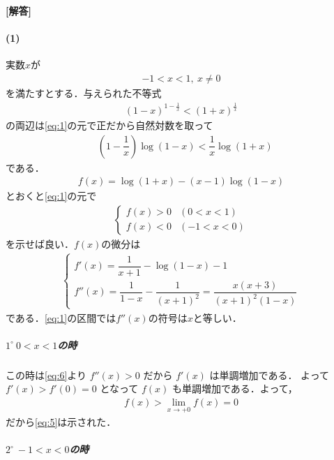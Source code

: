 \documentclass[../../main.tex]{subfiles}
\begin{document}
\begin{oframed}
  
\end{oframed}

{\bf [解答]}

\paragraph{(1)}

実数$x$が
\begin{align}
  -1 < x < 1, \ x \ne 0 \label{eq:1}
\end{align}
を満たすとする．与えられた不等式
\begin{align}
  {(1-x)}^{1-\frac{1}{x}}<{(1+x)}^{\frac{1}{x}} \label{eq:2}
\end{align}
の両辺は\cref{eq:1}の元で正だから自然対数を取って
\begin{align}
  & (1 - \dfrac{1}{x}) \log(1-x) < \dfrac{1}{x} \log(1+x) \label{eq:3}
\end{align}
である．
\begin{align}
  f(x) = \log(1+x) - (x-1)\log(1-x) \label{eq:4}
\end{align}
とおくと\cref{eq:1}の元で
\begin{align}
  \begin{cases}
    f(x)>0 & (0<x<1) \\
    f(x)<0 & (-1<x<0)
  \end{cases} \label{eq:5}
\end{align}
を示せば良い．$f(x)$の微分は
\begin{align}
  \begin{cases}
    f'(x) = \dfrac{1}{x+1} - \log(1-x) - 1 \\
    f''(x) = \dfrac{1}{1-x} - \dfrac{1}{(x+1)^2} = \dfrac{x(x+3)}{(x+1)^2(1-x)}
  \end{cases} \label{eq:6}
\end{align}
である．\cref{eq:1}の区間では$f''(x)$の符号は$x$と等しい．

\subparagraph{$1^\circ \ 0 < x < 1$の時}


この時は\cref{eq:6}より $f''(x) > 0$ だから $f'(x)$ は単調増加である．
よって $f'(x) > f'(0) = 0$ となって $f(x)$ も単調増加である．よって，
\begin{align}
  f(x) > \lim_{x \to +0} f(x) = 0
\end{align}
だから\cref{eq:5}は示された．

\subparagraph{$2^\circ \ -1 < x < 0$の時}
\end{document}

